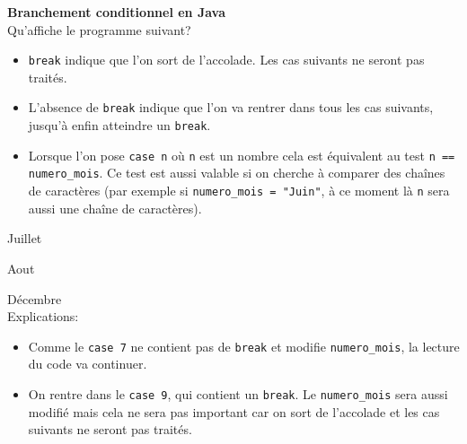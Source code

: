  \begin{Exercice}[10 minutes] \textbf{Branchement conditionnel en Java}\\
   Qu'affiche le programme suivant? 
   
   
    
     \begin{conseil}
          \begin{itemize}
             \item \lstinline{break} indique que l'on sort de l'accolade. Les cas suivants ne seront pas traités.
             \item L'absence de \lstinline{break} indique que l'on va rentrer dans tous les cas suivants, jusqu'à enfin atteindre un \lstinline{break}.
             \item Lorsque l'on pose \lstinline{case n} où \lstinline{n} est un nombre cela est équivalent au test \lstinline{n == numero_mois}. Ce test est aussi valable si on cherche à comparer des chaînes de caractères (par exemple si \lstinline{numero_mois = "Juin"}, à ce moment là \lstinline{n} sera aussi une chaîne de caractères).
          \end{itemize}
         
     \end{conseil}
     \begin{solution}
     
     Juillet
     
    Aout
    
    Décembre \\
    
    Explications:
    \begin{itemize}
             \item Comme le \lstinline{case 7} ne contient pas de \lstinline{break} et modifie \lstinline{numero_mois}, la lecture du code va continuer.
             \item On rentre dans le \lstinline{case 9}, qui contient un \lstinline{break}. Le \lstinline{numero_mois} sera aussi modifié mais cela ne sera pas important car on sort de l'accolade et les cas suivants ne seront pas traités.
       \end{itemize}
     \end{solution}   
 \end{Exercice}


